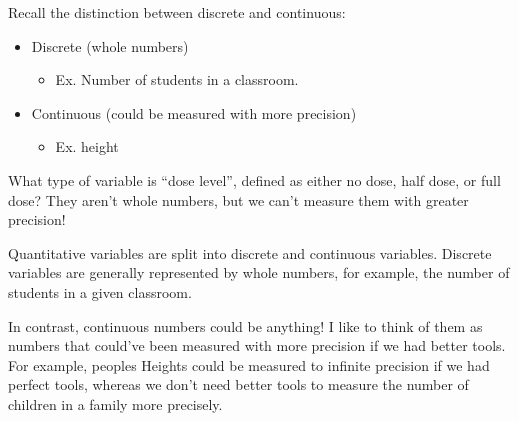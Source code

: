 \documentclass[
  letterpaper,
  DIV=11,
  numbers=noendperiod,
  oneside]{scrreprt}
\providecommand{\tightlist}{%
  \setlength{\itemsep}{0pt}\setlength{\parskip}{0pt}}\usepackage{longtable,booktabs,array}
\begin{document}
Recall the distinction between discrete and continuous:

\begin{itemize}
\tightlist
\item
  Discrete (whole numbers)

  \begin{itemize}
  \tightlist
  \item
    Ex. Number of students in a classroom.
  \end{itemize}
\item
  Continuous (could be measured with more precision)

  \begin{itemize}
  \tightlist
  \item
    Ex. height
  \end{itemize}
\end{itemize}

\begin{tcolorbox}[enhanced jigsaw, toprule=.15mm, colbacktitle=quarto-callout-warning-color!10!white, title=\textcolor{quarto-callout-warning-color}{\faExclamationTriangle}\hspace{0.5em}{Grey Area}, arc=.35mm, colframe=quarto-callout-warning-color-frame, colback=white, titlerule=0mm, left=2mm, bottomtitle=1mm, bottomrule=.15mm, breakable, opacitybacktitle=0.6, leftrule=.75mm, toptitle=1mm, coltitle=black, rightrule=.15mm, opacityback=0]

What type of variable is ``dose level'', defined as either no dose, half
dose, or full dose? They aren't whole numbers, but we can't measure them
with greater precision!

\end{tcolorbox}

Quantitative variables are split into discrete and continuous variables.
Discrete variables are generally represented by whole numbers, for
example, the number of students in a given classroom.

In contrast, continuous numbers could be anything! I like to think of
them as numbers that could've been measured with more precision if we
had better tools. For example, peoples Heights could be measured to
infinite precision if we had perfect tools, whereas we don't need better
tools to measure the number of children in a family more precisely.
\end{document}

